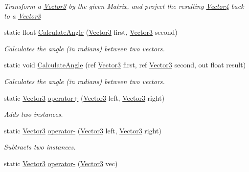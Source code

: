 \begin{DoxyCompactItemize}
\begin{DoxyCompactList}\small\item\em Transform a \hyperlink{struct_open_t_k_1_1_vector3}{Vector3} by the given Matrix, and project the resulting \hyperlink{struct_open_t_k_1_1_vector4}{Vector4} back to a \hyperlink{struct_open_t_k_1_1_vector3}{Vector3}\end{DoxyCompactList}\item 
static float \hyperlink{struct_open_t_k_1_1_vector3_ae25bbec421a496b3a5f3f836c310e374}{Calculate\-Angle} (\hyperlink{struct_open_t_k_1_1_vector3}{Vector3} first, \hyperlink{struct_open_t_k_1_1_vector3}{Vector3} second)
\begin{DoxyCompactList}\small\item\em Calculates the angle (in radians) between two vectors. \end{DoxyCompactList}\item 
static void \hyperlink{struct_open_t_k_1_1_vector3_a42aa96a32d7b02e9e12f77f2d8e891f7}{Calculate\-Angle} (ref \hyperlink{struct_open_t_k_1_1_vector3}{Vector3} first, ref \hyperlink{struct_open_t_k_1_1_vector3}{Vector3} second, out float result)
\begin{DoxyCompactList}\small\item\em Calculates the angle (in radians) between two vectors.\end{DoxyCompactList}\item 
static \hyperlink{struct_open_t_k_1_1_vector3}{Vector3} \hyperlink{struct_open_t_k_1_1_vector3_abbe8d408b4fdf7f352d38fea26ba0243}{operator+} (\hyperlink{struct_open_t_k_1_1_vector3}{Vector3} left, \hyperlink{struct_open_t_k_1_1_vector3}{Vector3} right)
\begin{DoxyCompactList}\small\item\em Adds two instances. \end{DoxyCompactList}\item 
static \hyperlink{struct_open_t_k_1_1_vector3}{Vector3} \hyperlink{struct_open_t_k_1_1_vector3_ac844ef22066798333cd0f54e46cef300}{operator-\/} (\hyperlink{struct_open_t_k_1_1_vector3}{Vector3} left, \hyperlink{struct_open_t_k_1_1_vector3}{Vector3} right)
\begin{DoxyCompactList}\small\item\em Subtracts two instances. \end{DoxyCompactList}\item 
static \hyperlink{struct_open_t_k_1_1_vector3}{Vector3} \hyperlink{struct_open_t_k_1_1_vector3_a96c9f1926bec0c3a344e1fcc65ed9bee}{operator-\/} (\hyperlink{struct_open_t_k_1_1_vector3}{Vector3} vec)

\end{DoxyCompactItemize}
